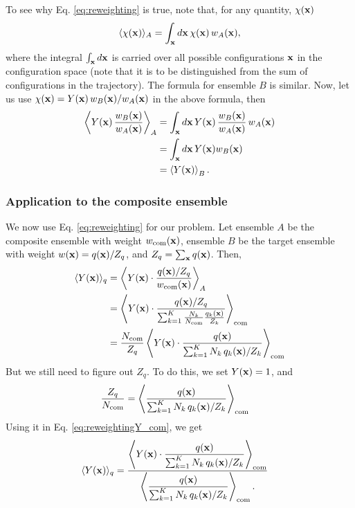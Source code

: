 \documentclass[aip,jcp,preprint,superscriptaddress]{revtex4-1}
\begin{document}
To see why Eq. \eqref{eq:reweighting} is true,
note that,
for any quantity, $\chi(\mathbf{x})$
%
\begin{align*}
  \langle \chi(\mathbf{x}) \rangle_A
=
  \int_{\mathbf{x}} d\mathbf{x} \, \chi(\mathbf{x}) \, w_A(\mathbf{x}),
\end{align*}
%
where the integral $\int_{\mathbf{x}} d\mathbf{x}$
is carried over all possible configurations $\mathbf{x}$
in the configuration space
(note that it is to be distinguished from
the sum of configurations in the trajectory).
%
The formula for ensemble $B$ is similar.
%
Now,
let us use $\chi(\mathbf{x}) = Y(\mathbf{x}) \, w_B(\mathbf{x}) / w_A(\mathbf{x})$
in the above formula, then
%
\begin{align*}
  \left \langle Y(\mathbf{x}) \, \frac{ w_B(\mathbf{x}) }{ w_A(\mathbf{x}) } \right \rangle_A
  &=
  \int_{\mathbf{x}} d\mathbf{x} \, Y(\mathbf{x}) \, \frac{ w_B(\mathbf{x}) }{ w_A(\mathbf{x}) } \, w_A(\mathbf{x})
  \notag \\
  &=
  \int_{\mathbf{x}} d\mathbf{x} \, Y(\mathbf{x}) w_B(\mathbf{x})
  \notag \\
  &= \left\langle Y(\mathbf{x}) \right\rangle_B.
\end{align*}



\subsubsection{Application to the composite ensemble}



We now use Eq. \eqref{eq:reweighting} for our problem.
%
Let ensemble $A$ be the composite ensemble
with weight $w_\mathrm{com}(\mathbf{x})$,
ensemble $B$ be the target ensemble
with weight $w(\mathbf{x}) = q(\mathbf{x})/Z_q$,
and $Z_q = \sum_{\mathbf{x}} q(\mathbf{x})$.
%
Then,
%
\begin{align}
  \langle Y(\mathbf{x}) \rangle_q
&=
  \left\langle Y(\mathbf{x}) \cdot
    \dfrac{ q(\mathbf{x})/Z_q }{ w_{\mathrm{com}}(\mathbf{x}) }
  \right\rangle_A
  \notag \\
&=
  \left\langle Y(\mathbf{x}) \cdot
  \dfrac{
    q(\mathbf{x})/Z_q
  }
  {
    \sum_{k = 1}^K \frac{N_k}{N_{\mathrm{com}}} \frac{ q_k(\mathbf{x}) } { Z_k }
  }
  \right\rangle_{\mathrm{com}}
  \notag \\
&=
  \frac{N_{\mathrm{com}}}{Z_q}
  \left\langle Y(\mathbf{x}) \cdot
  \dfrac{
    q(\mathbf{x})
  }
  {
    \sum_{k = 1}^K N_k \, q_k(\mathbf{x}) / Z_k
  }
  \right\rangle_{\mathrm{com}}
  \label{eq:reweightingY_com}
\end{align}
%
But we still need to figure out $Z_q$.
%
To do this, we set $Y(\mathbf{x}) = 1$, and
%
\begin{align*}
  \frac{Z_q}{N_{\mathrm{com}}}
&=
  \left\langle
  \dfrac{
    q(\mathbf{x})
  }
  {
    \sum_{k = 1}^K N_k \, q_k(\mathbf{x}) / Z_k
  }
  \right\rangle_{\mathrm{com}}
\end{align*}
%
Using it in Eq. \eqref{eq:reweightingY_com},
we get
\begin{align}
  \langle Y(\mathbf{x}) \rangle_q
&=
  \frac{
    \left\langle Y(\mathbf{x}) \cdot
    \dfrac{
      q(\mathbf{x})
    }
    {
      \sum_{k = 1}^K N_k \, q_k(\mathbf{x}) / Z_k
    }
    \right\rangle_{\mathrm{com}}
  }
  {
    \left\langle
    \dfrac{
      q(\mathbf{x})
    }
    {
      \sum_{k = 1}^K N_k \, q_k(\mathbf{x}) / Z_k
    }
    \right\rangle_{\mathrm{com}}.
  }
  \label{eq:reweighting_com}
\end{align}
\end{document}
